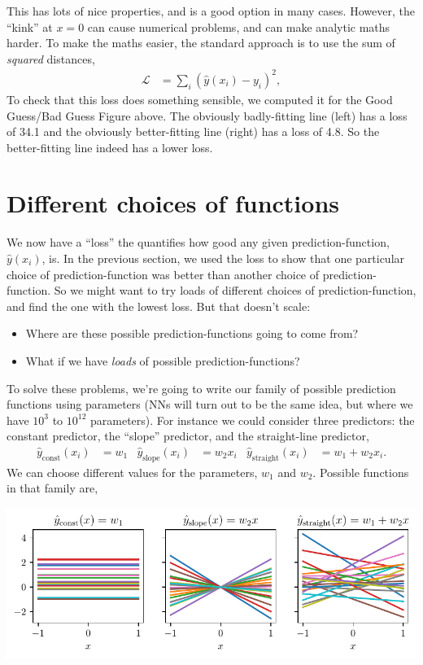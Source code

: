 \documentclass{article}
\newcommand{\yh}{\hat{y}}
\newcommand{\bracket}[3]{\left#1 #3 \right#2}
\renewcommand{\b}{\bracket{(}{)}}
\renewcommand{\L}{\mathcal{L}}
\begin{document}
This has lots of nice properties, and is a good option in many cases.
However, the ``kink'' at $x=0$ can cause numerical problems, and can make analytic maths harder.
To make the maths easier, the standard approach is to use the sum of \textit{squared} distances,
\begin{align}
  \L &= \sum_i \b{\yh(x_i) - y_i}^2,
\end{align}
To check that this loss does something sensible, we computed it for the Good Guess/Bad Guess Figure above.  The obviously badly-fitting line (left) has a loss of 34.1 and the obviously better-fitting line (right) has a loss of 4.8.
So the better-fitting line indeed has a lower loss.

\section{Different choices of functions}
We now have a ``loss'' the quantifies how good any given prediction-function, $\yh(x_i)$, is.
In the previous section, we used the loss to show that one particular choice of prediction-function was better than another choice of prediction-function.
So we might want to try loads of different choices of prediction-function, and find the one with the lowest loss.
But that doesn't scale:
\begin{itemize}
  \item Where are these possible prediction-functions going to come from?
  \item What if we have \textit{loads} of possible prediction-functions?
\end{itemize}
To solve these problems, we're going to write our family of possible prediction functions using parameters (NNs will turn out to be the same idea, but where we have $10^3$ to $10^{12}$ parameters).
For instance we could consider three predictors: the constant predictor, the ``slope'' predictor, and the straight-line predictor,
\begin{align}
  \yh_\text{const}(x_i) &= w_1 & 
  \yh_\text{slope}(x_i) &= w_2 x_i &
  \yh_\text{straight}(x_i) &= w_1 + w_2 x_i.
\end{align}
We can choose different values for the parameters, $w_1$ and $w_2$.
Possible functions in that family are,
\begin{center}
  \includegraphics[width=\textwidth]{families.pdf}
\end{center}
\end{document}
